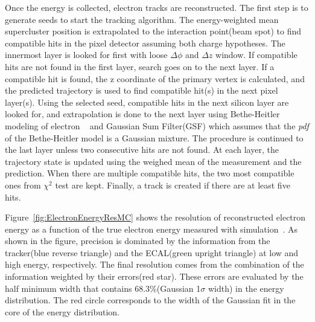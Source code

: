 Once the energy is collected, electron tracks are reconstructed. The first step is 
to generate seeds to start the tracking algorithm. The energy-weighted mean 
supercluster position is extrapolated to the interaction point(beam spot) 
to find compatible hits in the pixel detector assuming both charge hypotheses. 
The innermost layer is looked for first with loose $\Delta\phi$ and $\Delta z$ window. 
If compatible hits are not found in the first layer, search goes on to the next layer. 
If a compatible hit is found, the z coordinate of the primary vertex is calculated,
and the predicted trajectory is used to find compatible hit(s) in the next pixel layer(s).  
Using the selected seed, compatible hits in the next silicon layer are looked for,  
and extrapolation is done to the next layer using Bethe-Heitler modeling of electron 
\brem~\cite{BetheHeitler} 
and Gaussian Sum Filter(GSF) \cite{0954-3899-31-9-N01} which assumes that the \textit{pdf} 
of the Bethe-Heitler model is a Gaussian mixture. 
The procedure is continued to the last layer unless two consecutive hits are not found. 
At each layer, the trajectory state is updated using the weighed mean of the measurement 
and the prediction. When there are multiple compatible hits, the two most compatible ones 
from $\chi^2$ test are kept. Finally, a track is created if there are at least five hits. 

Figure~\ref{fig:ElectronEnergyResMC} shows the resolution of reconstructed electron energy 
as a function of the true electron energy measured with simulation~\cite{PAS-HIG-13-002}.   
As shown in the figure, precision is dominated by the information 
from the tracker(blue reverse triangle) and the ECAL(green upright triangle) 
at low and high energy, respectively. 
The final resolution comes from the combination of the information weighted by 
their errors(red star). These errors are evaluated by the half minimum width that 
contains 68.3\%(Gaussian 1$\sigma$ width) in the energy distribution. 
The red circle corresponds to the width of the Gaussian fit in the core of the 
energy distribution. 

